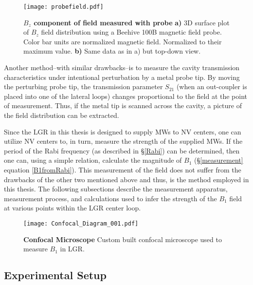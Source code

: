 \begin{figure}[t!]
\centering
\texttt{[image: probefield.pdf]}  
\caption{\textbf{$B_z$ component of field measured with probe} \textbf{a)} 3D surface plot of $B_z$ field distribution using a Beehive 100B magnetic field probe. Color bar units are normalized magnetic field. Normalized to their maximum value. \textbf{b)} Same data as in a) but top-down view. }
\label{LGR_probe}
\end{figure}

Another method--with similar drawbacks--is to measure the cavity transmission characteristics under intentional perturbation by a metal probe tip. By moving the perturbing probe tip, the transmission parameter $S_{21}$ (when an out-coupler is placed into one of the lateral loops) changes proportional to the field at the point of measurement. Thus, if the metal tip is scanned across the cavity, a picture of the field distribution can be extracted.  

Since the LGR in this thesis is designed to supply MWs to NV centers, one can utilize NV centers to, in turn, measure the strength of the supplied MWs. If the period of the Rabi frequency (as described in \S \ref{Rabi}) can be determined, then one can, using a simple relation, calculate the magnitude of $B_1$ (\S \ref{measurement} equation \ref{B1fromRabi}). This measurement of the field does not suffer from the drawbacks of the other two mentioned above and thus, is the method employed in this thesis. The following subsections describe the measurement apparatus, measurement process, and calculations used to infer the strength of the $B_1$ field at various points within the LGR center loop.

\begin{landscape}
\begin{figure}[b!]
\centering
\texttt{[image: Confocal\_Diagram\_001.pdf]}  
\caption{\textbf{Confocal Microscope} Custom built confocal microscope used to measure $B_1$ in LGR.}
\label{LGR_confocal_diagram}
\end{figure}
\end{landscape}

\subsection{Experimental Setup} \label{setup}

